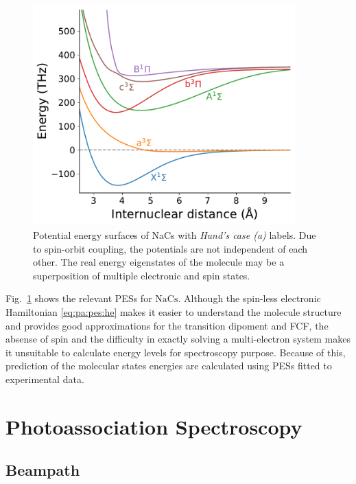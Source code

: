 \begin{figure}
  \centering
  \includegraphics[width=0.9\textwidth]{figures/pa_pes.pdf}
  \caption[NaCs potential energy surfaces]{
    Potential energy surfaces of NaCs with \textit{Hund's case (a)} labels.
    Due to spin-orbit coupling, the potentials are not independent of each other.
    The real energy eigenstates of the molecule may be a superposition of multiple
    electronic and spin states.
    \label{fig:pa-pes}}
\end{figure}

Fig.~\ref{fig:pa-pes} shows the relevant PESs for $\mathrm{NaCs}$.
Although the spin-less electronic Hamiltonian \ref{eq:pa:pes:he} makes it easier
to understand the molecule structure and provides good approximations for the
transition dipoment and FCF, the absense of spin and the difficulty in exactly solving
a multi-electron system makes it unsuitable to calculate energy levels
for spectroscopy purpose.
Because of this, prediction of the molecular states energies are calculated using
PESs fitted to experimental data\cite{docenko_coupling_2006,zaharova_solution_2009,grochola_spin-forbidden_2011,grochola_investigation_2010}.

\section{Photoassociation Spectroscopy}
\label{pa:pa}

\subsection{Beampath}
\label{pa:beampath}

